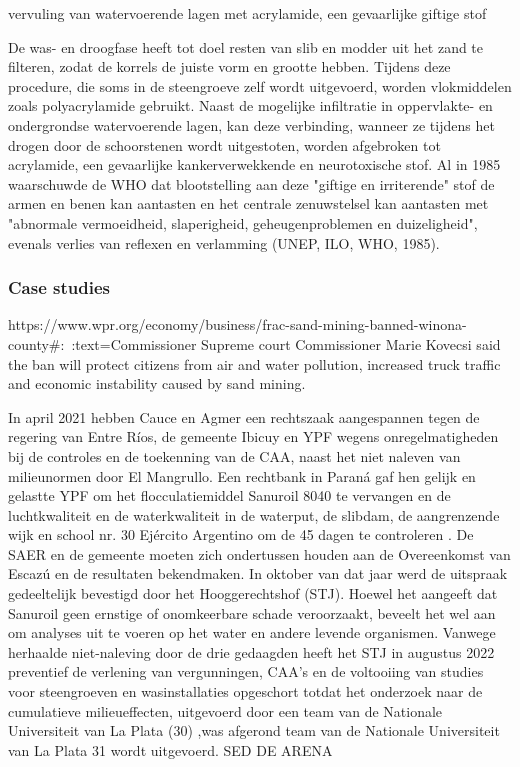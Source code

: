vervuling van watervoerende lagen met acrylamide, een gevaarlijke giftige stof

De was- en droogfase heeft tot doel resten van slib en modder uit het zand te filteren, zodat de korrels de juiste vorm en grootte hebben. Tijdens deze procedure, die soms in de steengroeve zelf wordt uitgevoerd, worden vlokmiddelen zoals polyacrylamide gebruikt. Naast de mogelijke infiltratie in oppervlakte- en ondergrondse watervoerende lagen, kan deze verbinding, wanneer ze tijdens het drogen door de schoorstenen wordt uitgestoten, worden afgebroken tot acrylamide, een gevaarlijke kankerverwekkende en neurotoxische stof. Al in 1985 waarschuwde de WHO dat blootstelling aan deze "giftige en irriterende" stof de armen en benen kan aantasten en het centrale zenuwstelsel kan aantasten met "abnormale vermoeidheid, slaperigheid, geheugenproblemen en duizeligheid", evenals verlies van reflexen en verlamming (UNEP, ILO, WHO, 1985).

\subsubsection{Case studies}
https://www.wpr.org/economy/business/frac-sand-mining-banned-winona-county#:~:text=Commissioner%
Supreme court
Commissioner Marie Kovecsi said the ban will protect citizens from air and water pollution, increased truck traffic and economic instability caused by sand mining.

 In april 2021 hebben Cauce en Agmer een rechtszaak aangespannen tegen de regering van Entre Ríos, de gemeente Ibicuy en YPF wegens onregelmatigheden bij de controles en de toekenning van de CAA, naast het niet naleven van milieunormen door El Mangrullo. Een rechtbank in Paraná gaf hen gelijk en gelastte YPF om het flocculatiemiddel Sanuroil 8040 te vervangen en de luchtkwaliteit en de waterkwaliteit in de waterput, de slibdam, de aangrenzende wijk en school nr. 30 Ejército Argentino om de 45 dagen te controleren . De SAER en de gemeente moeten zich ondertussen houden aan de Overeenkomst van Escazú en de resultaten bekendmaken. In oktober van dat jaar werd de uitspraak gedeeltelijk bevestigd door het Hooggerechtshof (STJ). Hoewel het aangeeft dat Sanuroil geen ernstige of onomkeerbare schade veroorzaakt, beveelt het wel aan om analyses uit te voeren op het water en andere levende organismen. Vanwege herhaalde niet-naleving door de drie gedaagden heeft het STJ in augustus 2022 preventief de verlening van vergunningen, CAA's en de voltooiing van studies voor steengroeven en wasinstallaties opgeschort totdat het onderzoek naar de cumulatieve milieueffecten, uitgevoerd door een team van de Nationale Universiteit van La Plata (30) ,was afgerond  team van de Nationale Universiteit van La Plata 31 wordt uitgevoerd. SED DE ARENA


